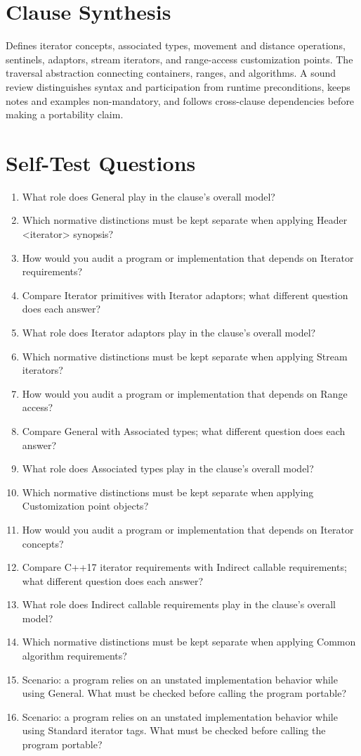 \documentclass[11pt,letterpaper]{article}
\begin{document}
\section{Clause Synthesis}
\begin{CornellReferenceOrientationBox}Defines iterator concepts, associated types, movement and distance operations, sentinels, adaptors, stream iterators, and range-access customization points. The traversal abstraction connecting containers, ranges, and algorithms. A sound review distinguishes syntax and participation from runtime preconditions, keeps notes and examples non-mandatory, and follows cross-clause dependencies before making a portability claim.\end{CornellReferenceOrientationBox}
\section{Self-Test Questions}
\begin{enumerate}
\item What role does General play in the clause's overall model?
\item Which normative distinctions must be kept separate when applying Header <iterator> synopsis?
\item How would you audit a program or implementation that depends on Iterator requirements?
\item Compare Iterator primitives with Iterator adaptors; what different question does each answer?
\item What role does Iterator adaptors play in the clause's overall model?
\item Which normative distinctions must be kept separate when applying Stream iterators?
\item How would you audit a program or implementation that depends on Range access?
\item Compare General with Associated types; what different question does each answer?
\item What role does Associated types play in the clause's overall model?
\item Which normative distinctions must be kept separate when applying Customization point objects?
\item How would you audit a program or implementation that depends on Iterator concepts?
\item Compare C++17 iterator requirements with Indirect callable requirements; what different question does each answer?
\item What role does Indirect callable requirements play in the clause's overall model?
\item Which normative distinctions must be kept separate when applying Common algorithm requirements?
\item Scenario: a program relies on an unstated implementation behavior while using General. What must be checked before calling the program portable?
\item Scenario: a program relies on an unstated implementation behavior while using Standard iterator tags. What must be checked before calling the program portable?
\end{enumerate}
\end{document}
